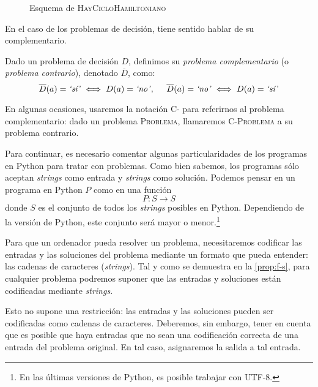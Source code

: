 \begin{figure}[H]
\centering
\vspace*{8pt}

\caption{Esquema de \textsc{HayCicloHamiltoniano}}
\label{fig:esquema-hayciclohamiltoniano}
\end{figure}
En el caso de los problemas de decisión, tiene sentido hablar de su complementario.

\begin{definicion}\label{def:problema-complementario}
Dado un problema de decisión $D$, definimos su \emph{problema complementario} (o \emph{problema contrario}), denotado $\overline{D}$, como:
$$
    \overline{D}(a) = \text{\emph{`sí'}} \iff D(a) = \text{\emph{`no'}},\;\;\;\;\;\overline{D}(a) = \text{\emph{`no'}} \iff D(a) = \text{\emph{`sí'}}
$$
\end{definicion}

En algunas ocasiones, usaremos la notación C- para referirnos al problema complementario: dado un problema \textsc{Problema}, llamaremos \textsc{C-Problema} a su problema contrario.

\vspace{8pt}

Para continuar, es necesario comentar algunas particularidades de los programas en Python para tratar con problemas. Como bien sabemos, los programas sólo aceptan \emph{strings} como entrada y \emph{strings} como solución. Podemos pensar en un programa en Python $P$ como en una función
$$
    P : S \longrightarrow S
$$
donde $S$ es el conjunto de todos los \emph{strings} posibles en Python. Dependiendo de la versión de Python, este conjunto será mayor o menor.\footnote{En las últimas versiones de Python, es posible trabajar con UTF-8.}

Para que un ordenador pueda resolver un problema, necesitaremos codificar las entradas y las soluciones del problema mediante un formato que pueda entender: las cadenas de caracteres (\emph{strings}). Tal y como se demuestra en la \cref{prop:f-s}, para cualquier problema podremos suponer que las entradas y soluciones están codificadas mediante \emph{strings}.

Esto no supone una restricción: las entradas y las soluciones pueden ser codificadas como cadenas de caracteres. Deberemos, sin embargo, tener en cuenta que es posible que haya entradas que no sean una codificación correcta de una entrada del problema original. En tal caso, asignaremos la salida  a tal entrada.

